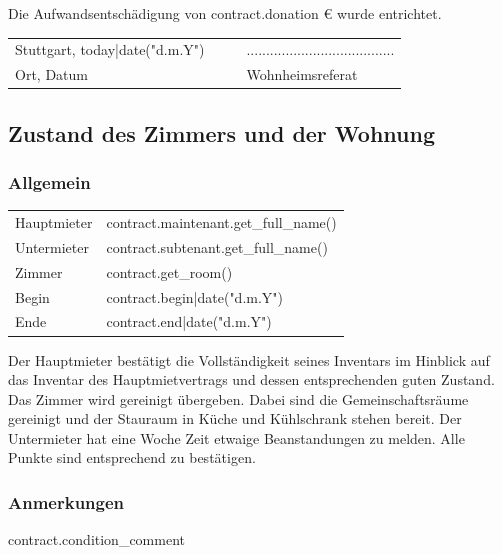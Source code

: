 \documentclass[9pt,pdftex,a4paper]{article}
\newcommand{\signLine}{......................................}
\begin{document}
{{Die Aufwandsentschädigung von {{ contract.donation }}€ wurde entrichtet.

\vfill

\begin{tabularx}{\textwidth}{@{}YYYY@{}}
Stuttgart, {{ today|date("d.m.Y") }} &  &  & \signLine\\
Ort, Datum &  &  & Wohnheimsreferat\\
\end{tabularx}

%
%

\newpage

\subsection*{Zustand des Zimmers und der Wohnung}

\subsubsection*{Allgemein}
\begin{tabularx}{\textwidth}{XX}
Hauptmieter & {{ contract.maintenant.get_full_name() }}\\
Untermieter &  {{ contract.subtenant.get_full_name() }}\\
Zimmer & {{ contract.get_room() }}\\
Begin & {{ contract.begin|date("d.m.Y") }}\\
Ende & {{ contract.end|date("d.m.Y") }}\\
\end{tabularx}\bigskip

Der Hauptmieter bestätigt die Vollständigkeit seines Inventars im Hinblick auf das Inventar des Hauptmietvertrags und dessen entsprechenden guten Zustand.
Das Zimmer wird gereinigt übergeben. Dabei sind die Gemeinschaftsräume gereinigt und der Stauraum in Küche und Kühlschrank stehen bereit.
Der Untermieter hat eine Woche Zeit etwaige Beanstandungen zu melden.
Alle Punkte sind entsprechend zu bestätigen.

{%
\subsubsection*{Anmerkungen}

{{ contract.condition_comment }}

}}}
\end{document}
